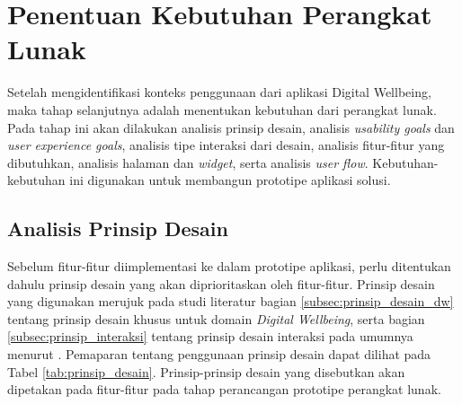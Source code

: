 \section{Penentuan Kebutuhan Perangkat Lunak}

Setelah mengidentifikasi konteks penggunaan dari aplikasi Digital Wellbeing, maka tahap selanjutnya adalah menentukan kebutuhan dari perangkat lunak. Pada tahap ini akan dilakukan analisis prinsip desain, analisis \textit{usability goals} dan \textit{user experience goals}, analisis tipe interaksi dari desain, analisis fitur-fitur yang dibutuhkan, analisis halaman dan \textit{widget}, serta analisis \textit{user flow}. Kebutuhan-kebutuhan ini digunakan untuk membangun prototipe aplikasi solusi.

\subsection{Analisis Prinsip Desain}
Sebelum fitur-fitur diimplementasi ke dalam prototipe aplikasi, perlu ditentukan dahulu prinsip desain yang akan diprioritaskan oleh fitur-fitur. Prinsip desain yang digunakan merujuk pada studi literatur bagian \ref{subsec:prinsip_desain_dw} tentang prinsip desain khusus untuk domain \textit{Digital Wellbeing}, serta bagian \ref{subsec:prinsip_interaksi} tentang prinsip desain interaksi pada umumnya menurut \textcite{PreeceRogersSharp15}. Pemaparan tentang penggunaan prinsip desain dapat dilihat pada Tabel \ref{tab:prinsip_desain}. Prinsip-prinsip desain yang disebutkan akan dipetakan pada fitur-fitur pada tahap perancangan prototipe perangkat lunak.

